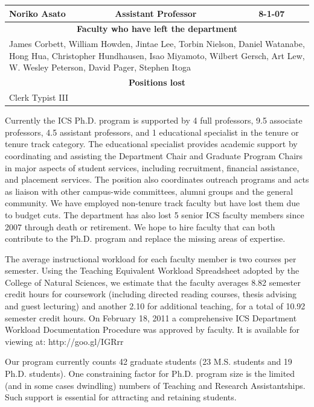 \documentclass[12pt]{article}
\begin{document}
\begin{table}[htbp]
\begin{center}
\begin{tabular}{|l|l|l|}
Noriko Asato & Assistant Professor & 8-1-07 \\ \hline \hline
\multicolumn{3}{|c|}{ {\bf Faculty who have left the department} } \\ \hline
\multicolumn{3}{|p{5in}|}{ James Corbett, William Howden, Jintae Lee, Torbin Nielson, Daniel Watanabe,
Hong Hua, Christopher Hundhausen, Isao Miyamoto, Wilbert Gersch, Art Lew,
W. Wesley Peterson, David Pager, Stephen Itoga} \\ \hline \hline
\multicolumn{3}{|c|}{ {\bf Positions lost} } \\ \hline
\multicolumn{3}{|p{5in}|}{ Clerk Typist III} \\ \hline
\end{tabular}
\end{center}
\end{table}

Currently the ICS Ph.D. program is supported by 4 full professors, 9.5
associate professors, 4.5 assistant professors, and 1 educational
specialist in the tenure or tenure track category. The educational
specialist provides academic support by coordinating and assisting the
Department Chair and Graduate Program Chairs in major aspects of student
services, including recruitment, financial assistance, and placement
services. The position also coordinates outreach programs and acts as
liaison with other campus-wide committees, alumni groups and the general
community. We have employed non-tenure track faculty but have lost them due
to budget cuts. The department has also lost 5 senior ICS faculty members since
2007 through death or retirement. We hope to hire faculty that can both
contribute to the Ph.D. program and replace the missing areas of expertise.

The average instructional workload for each faculty member is two courses
per semester. Using the Teaching Equivalent Workload Spreadsheet adopted by
the College of Natural Sciences, we estimate that the faculty averages 8.82
semester credit hours for coursework (including directed reading courses,
thesis advising and guest lecturing) and another 2.10 for additional
teaching, for a total of 10.92 semester credit hours. On February 18, 2011
a comprehensive ICS Department Workload Documentation Procedure was
approved by faculty. It is available for viewing at: http://goo.gl/IGRrr

Our program currently counts 42 graduate students (23 M.S. students and 19
Ph.D. students).  One constraining factor for Ph.D. program size is the
limited (and in some cases dwindling) numbers of Teaching and Research
Assistantships. Such support is essential for attracting and retaining
students.
\end{document}
